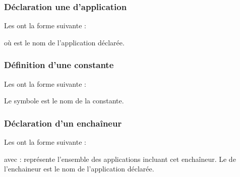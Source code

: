 \documentclass[letterpaper,10pt,french]{sphinxmanual}
\begin{document}
\subsubsection{Déclaration une d’application}
\label{\detokenize{syntax:declaration-une-d-application}}
\sphinxAtStartPar
Les  ont la forme suivante :

\begin{sphinxVerbatim}[commandchars=\\\{\}]
 
\end{sphinxVerbatim}

\sphinxAtStartPar
où  est le nom de l’application
déclarée.


\subsubsection{Définition d’une constante}
\label{\detokenize{syntax:definition-d-une-constante}}
\sphinxAtStartPar
Les  ont la forme suivante :

\begin{sphinxVerbatim}[commandchars=\\\{\}]
      
\end{sphinxVerbatim}

\sphinxAtStartPar
Le symbole est le nom de la constante.


\subsubsection{Déclaration d’un enchaîneur}
\label{\detokenize{syntax:declaration-d-un-enchaineur}}
\sphinxAtStartPar
Les  ont la forme suivante :

\begin{sphinxVerbatim}[commandchars=\\\{\}]
    
\end{sphinxVerbatim}

\sphinxAtStartPar
avec :
 représente l’ensemble des applications incluant cet enchaîneur.
Le  de l’enchaineur est le nom de l’application déclarée.
\end{document}
